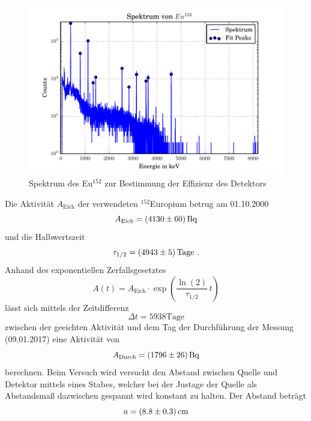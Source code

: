 \begin{figure}[h]
  \centering
  \includegraphics[width=\textwidth]{./build/SpektEu.pdf}
   \caption{Spektrum des Eu$^{152}$ zur Bestimmung der Effizienz des Detektors}
  \label{fig:SpekCs}
\end{figure}
Die Aktivität $A_\text{Eich}$ der verwendeten $^{152}$Europium betrug am 01.10.2000
\begin{equation}
  A_\text{Eich} = (\num{4130 +- 60}) \, \text{Bq}
  \label{eqn:AktEu}
\end{equation}
und die Halbwertszeit
\begin{equation}
  \tau_{1/2} = (\num{4943 +- 5}) \, \text{Tage} \ .
  \label{eqn:halb}
\end{equation}
Anhand des exponentiellen Zerfallsgesetztes 
\begin{equation}
  A(t) = A_\text{Eich} \cdot \exp \left(\frac{\ln(2)}{\tau_{1/2}} \, t \right)
  \label{eqn:zerfG}
\end{equation}
lässt sich mittels der Zeitdifferenz
\begin{equation}
  \Delta t = 5938 \text{Tage} 
\end{equation}
zwischen der geeichten Aktivität und dem Tag der Durchführung der Messung (09.01.2017) eine Aktivität von
\begin{equation}
  A_\text{Durch} = (\num{1796 +- 26}) \, \text{Bq}
  \label{eqn:AktEEu}
\end{equation}
berechnen. Beim Versuch wird versucht den Abstand zwischen Quelle und Detektor mittels eines Stabes, welcher bei der Justage der Quelle als Abstandsmaß dazwischen gespannt wird konstant zu halten. Der Abstand beträgt
\begin{equation}
  a = (\num{8.8 +-0.3}) \, \text{cm}
\end{equation}
